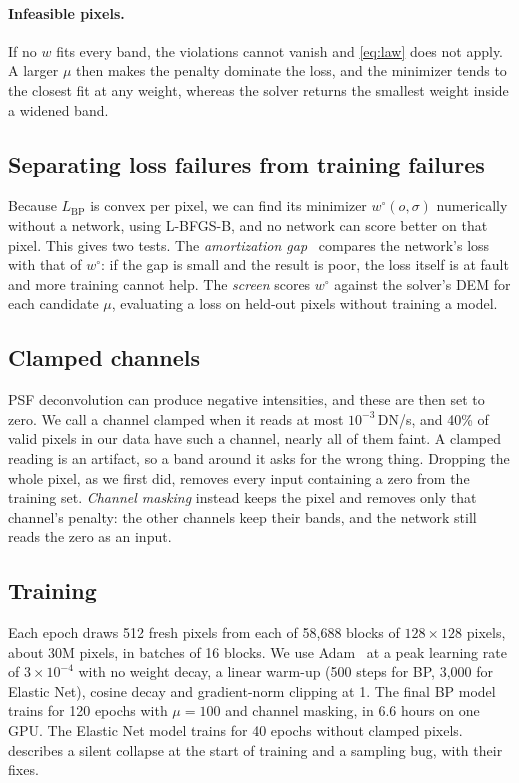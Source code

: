\paragraph{Infeasible pixels.}
If no $w$ fits every band, the violations cannot vanish and \cref{eq:law} does not apply. A larger $\mu$ then makes the penalty dominate the loss, and the minimizer tends to the closest fit at any weight, whereas the solver returns the smallest weight inside a widened band.

\subsection{Separating loss failures from training failures}
\label{sec:gap}

Because $L_{\mathrm{BP}}$ is convex per pixel, we can find its minimizer $w^\circ(o,\sigma)$ numerically without a network, using L-BFGS-B, and no network can score better on that pixel. This gives two tests. The \emph{amortization gap}~\cite{cremer2018inference} compares the network's loss with that of $w^\circ$: if the gap is small and the result is poor, the loss itself is at fault and more training cannot help. The \emph{screen} scores $w^\circ$ against the solver's DEM for each candidate $\mu$, evaluating a loss on held-out pixels without training a model.

\subsection{Clamped channels}
\label{sec:clamp}

PSF deconvolution can produce negative intensities, and these are then set to zero. We call a channel clamped when it reads at most $10^{-3}$\,DN/s, and 40\% of valid pixels in our data have such a channel, nearly all of them faint. A clamped reading is an artifact, so a band around it asks for the wrong thing. Dropping the whole pixel, as we first did, removes every input containing a zero from the training set. \emph{Channel masking} instead keeps the pixel and removes only that channel's penalty: the other channels keep their bands, and the network still reads the zero as an input.

\subsection{Training}

Each epoch draws 512 fresh pixels from each of 58,688 blocks of $128\times128$ pixels, about 30M pixels, in batches of 16 blocks. We use Adam~\cite{kingma2015adam} at a peak learning rate of $3\times10^{-4}$ with no weight decay, a linear warm-up (500 steps for BP, 3,000 for Elastic Net), cosine decay and gradient-norm clipping at 1. The final BP model trains for 120 epochs with $\mu=100$ and channel masking, in 6.6 hours on one GPU. The Elastic Net model trains for 40 epochs without clamped pixels.  describes a silent collapse at the start of training and a sampling bug, with their fixes.

